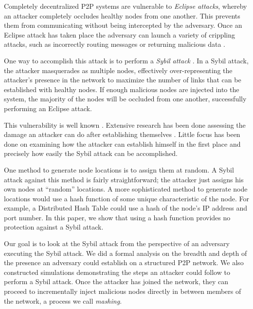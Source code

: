 \documentclass[11pt,conference]{IEEEtran}
\begin{document}
Completely decentralized P2P systems are vulnerable to \textit{Eclipse attacks}, whereby an attacker completely occludes healthy nodes from one another.
This prevents them from communicating without being intercepted by the adversary.
Once an Eclipse attack has taken place the adversary can launch a variety of crippling attacks, such as incorrectly routing messages or returning malicious data \cite{srivatsa2004vulnerabilities}.

One way to accomplish this attack is to perform a \emph{Sybil attack} \cite{sybil}.
In a Sybil attack, the attacker masquerades as multiple nodes, effectively over-representing the attacker's presence in the network to maximize the number of links that can be established with healthy nodes.
If enough malicious nodes are injected into the system, the majority of the nodes will be occluded from one another, successfully performing an Eclipse attack.

This vulnerability is well known \cite{dhtsec}. 
Extensive research has been done assessing the damage an attacker can do after establishing themselves \cite{srivatsa2004vulnerabilities}.
Little focus has been done on examining how the attacker can establish himself in the first place and precisely how easily the Sybil attack can be accomplished.

One method to generate node locations is to assign them at random.
A Sybil attack against this method is fairly straightforward; the attacker just assigns his own nodes at ``random'' locations.
A more sophisticated method to generate node locations would use a hash function of some unique characteristic of the node.
For example, a Distributed Hash Table could use a hash of the node's IP address and port number.
In this paper, we show that using a hash function provides no protection against a Sybil attack.

Our goal is to look at the Sybil attack from the perspective of an adversary executing the Sybil attack.
We did a formal analysis on the breadth and depth of the presence an adversary could establish on a structured P2P network.
We also constructed simulations demonstrating the steps an attacker could follow to perform a Sybil attack.
Once the attacker has joined the network, they can proceed to incrementally inject malicious nodes directly in between members of the network, a process we call \textit{mashing}.
\end{document}
